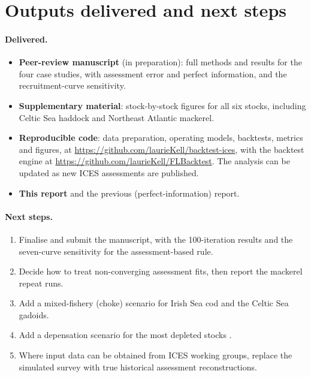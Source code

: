\documentclass[11pt,a4paper]{article}
\begin{document}
\section{Outputs delivered and next steps}
\label{sec:outputs}

\paragraph{Delivered.}
\begin{itemize}
\item \textbf{Peer-review manuscript} (in preparation): full methods and
results for the four case studies, with assessment error and perfect
information, and the recruitment-curve sensitivity.
\item \textbf{Supplementary material}: stock-by-stock figures for all six
stocks, including Celtic Sea haddock and Northeast Atlantic mackerel.
\item \textbf{Reproducible code}: data preparation, operating models,
backtests, metrics and figures, at
\url{https://github.com/laurieKell/backtest-ices}, with the backtest engine
at \url{https://github.com/laurieKell/FLBacktest}. The analysis can be
updated as new ICES assessments are published.
\item \textbf{This report} and the previous (perfect-information) report.
\end{itemize}

\paragraph{Next steps.}
\begin{enumerate}
\item Finalise and submit the manuscript, with the 100-iteration results
and the seven-curve sensitivity for the assessment-based rule.
\item Decide how to treat non-converging assessment fits, then report the
mackerel repeat runs.
\item Add a mixed-fishery (choke) scenario for Irish Sea cod and the
Celtic Sea gadoids.
\item Add a depensation scenario for the most depleted stocks
\citep{albertsen2025rebuilding}.
\item Where input data can be obtained from ICES working groups, replace the
simulated survey with true historical assessment reconstructions.
\end{enumerate}



\end{document}
